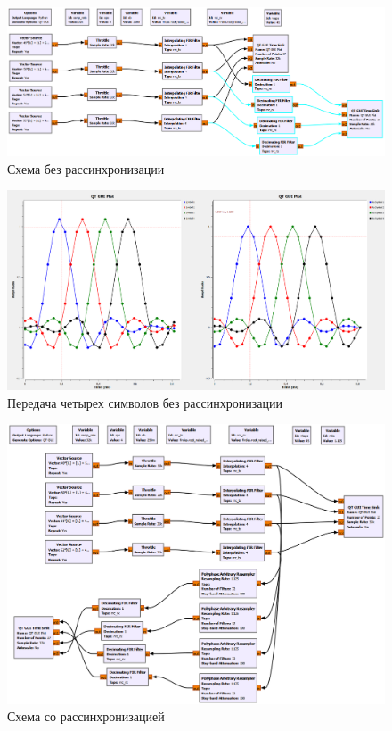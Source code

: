 \documentclass[a4paper]{article}
\begin{document}
            \begin{figure}[H]
                \centering
                \includegraphics[width=\textwidth]{img/p3_1.png}
                \caption{Схема без рассинхронизации}
                \label{fig:p3_1}
            \end{figure}
            
            \begin{figure}[H]
                \centering
                \includegraphics[width=\textwidth]{img/p3_2.png}
                \caption{Передача четырех символов без рассинхронизации}
                \label{fig:p3_2}
            \end{figure}
            
            \begin{figure}[H]
                \centering
                \includegraphics[width=\textwidth]{img/p3_3.png}
                \caption{Схема со рассинхронизацией}
                \label{fig:p3_3}
            \end{figure}
            
\end{document}
